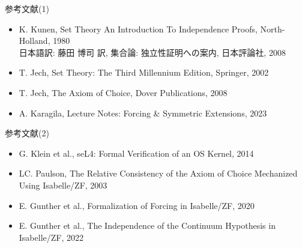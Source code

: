 \documentclass[17pt,aspectratio=169]{beamer}
\begin{document}
\appendix
{}
 
\begin{frame}{参考文献(1)}
    \vspace{-30pt}
    \, {\footnotesize 
    \begin{itemize}[itemsep=5pt, left=0pt]
        \item K. Kunen, Set Theory An Introduction To Independence Proofs, North-Holland, 1980 \\
              日本語訳: 藤田 博司 訳, 集合論: 独立性証明への案内, 日本評論社, 2008
        \item T. Jech, Set Theory: The Third Millennium Edition, Springer, 2002
        \item T. Jech, The Axiom of Choice, Dover Publications, 2008
        \item A. Karagila, Lecture Notes: Forcing \& Symmetric Extensions, 2023
    \end{itemize}
    }

\end{frame}

\begin{frame}{参考文献(2)}
    \vspace{-30pt}
    \, {\footnotesize 
    \begin{itemize}[itemsep=5pt, left=0pt]
        \item G. Klein et al., seL4: Formal Verification of an OS Kernel, 2014
        \item LC. Paulson, The Relative Consistency of the Axiom of Choice Mechanized Using Isabelle/ZF, 2003
        \item E. Gunther et al., Formalization of Forcing in Isabelle/ZF, 2020
        \item E. Gunther et al., The Independence of the Continuum Hypothesis in Isabelle/ZF, 2022
    \end{itemize}
    }

\end{frame}

\end{document}
